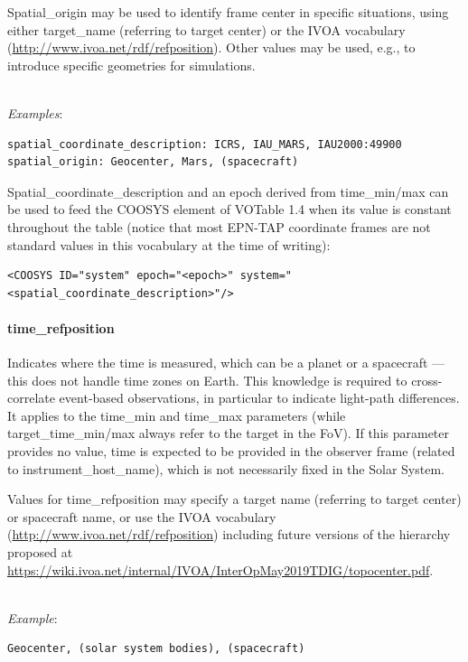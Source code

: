 \documentclass[11pt,a4paper]{ivoa}
\begin{document}
Spatial\_origin may be used to identify frame center
in specific situations, using either target\_name
(referring to target center) or the IVOA vocabulary
(\url{http://www.ivoa.net/rdf/refposition}).
Other values may be used, e.g., to introduce specific geometries for
simulations.

\textbf{\\}
\emph{Examples}:

\begin{verbatim}
spatial_coordinate_description: ICRS, IAU_MARS, IAU2000:49900
spatial_origin: Geocenter, Mars, (spacecraft)
\end{verbatim}


Spatial\_coordinate\_description and an epoch derived from time\_min/max
can be used to feed the COOSYS element of VOTable 1.4 when its value
is constant throughout the table (notice that most EPN-TAP coordinate
frames are not standard values in this vocabulary at the time of writing):

\begin{verbatim}
<COOSYS ID="system" epoch="<epoch>" system="<spatial_coordinate_description>"/>
\end{verbatim}

\paragraph{time\_refposition}

Indicates where the time is measured, which can be a planet or a
spacecraft — this does not handle time zones on Earth. This knowledge
is required to cross-correlate event-based observations, in particular
to indicate light-path differences. It applies to the time\_min and
time\_max parameters (while target\_time\_min/max always refer to the
target in the FoV). If this parameter provides no value, time is expected
to be provided in the observer frame (related to instrument\_host\_name),
which is not necessarily fixed in the Solar System.

Values for time\_refposition may specify a target name (referring
to target center) or spacecraft name, or use the IVOA vocabulary
(\url{http://www.ivoa.net/rdf/refposition})
including future versions of the hierarchy proposed at
\url{https://wiki.ivoa.net/internal/IVOA/InterOpMay2019TDIG/topocenter.pdf}.

\textbf{\\}
\emph{Example}:

\begin{verbatim}
Geocenter, (solar system bodies), (spacecraft)
\end{verbatim}
\end{document}
